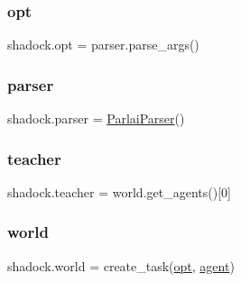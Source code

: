 \mbox{\label{namespaceshadock_a1f0720d3750ae2bb3fbbaad0fd0e33ae}} 
\subsubsection{\texorpdfstring{opt}{opt}}
{\footnotesize\ttfamily shadock.\+opt = parser.\+parse\+\_\+args()}

\mbox{\label{namespaceshadock_aa4e07d2eebb7832812fa751fcc89196b}} 
\subsubsection{\texorpdfstring{parser}{parser}}
{\footnotesize\ttfamily shadock.\+parser = \hyperlink{classparlai_1_1core_1_1params_1_1ParlaiParser}{Parlai\+Parser}()}

\mbox{\label{namespaceshadock_abc8ed101017c61d6a944f70094e73277}} 
\subsubsection{\texorpdfstring{teacher}{teacher}}
{\footnotesize\ttfamily shadock.\+teacher = world.\+get\+\_\+agents()\mbox{[}0\mbox{]}}

\mbox{\label{namespaceshadock_a7a57065851adb01a5966c61a702b2748}} 
\subsubsection{\texorpdfstring{world}{world}}
{\footnotesize\ttfamily shadock.\+world = create\+\_\+task(\hyperlink{namespaceshadock_a1f0720d3750ae2bb3fbbaad0fd0e33ae}{opt}, \hyperlink{namespaceshadock_ad75e4ea6fe08d47d4a18de24b6bc2455}{agent})}

